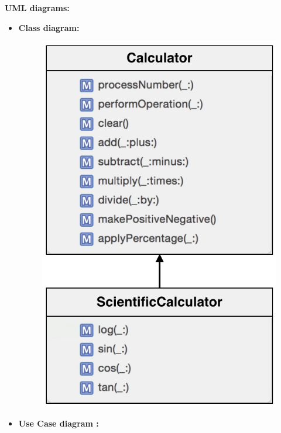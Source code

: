 \documentclass[a4paper,12pt]{article}
\begin{document}
\noindent \textbf{UML diagrams:}\\
\begin{itemize}
\item \textbf{Class diagram:}
\begin{figure}[h!]
		\centering
		\includegraphics[scale=0.5]{Sci_Calc_class.jpg}
	\end{figure}

\newpage

\item \textbf{Use Case diagram :}


\end{itemize}
\end{document}

